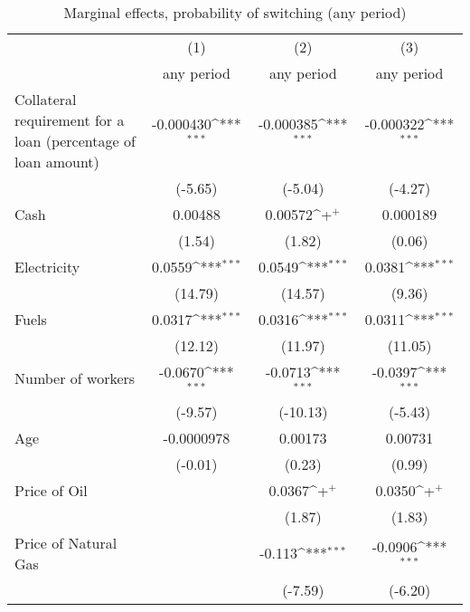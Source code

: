 \begin{table}[htbp]\centering
\def\sym#1{\ifmmode^{#1}\else\(^{#1}\)\fi}
\caption{Marginal effects, probability of switching (any period)}
\begin{tabular}{l*{3}{c}}
\hline\hline
                    &\multicolumn{1}{c}{(1)}&\multicolumn{1}{c}{(2)}&\multicolumn{1}{c}{(3)}\\
                    &\multicolumn{1}{c}{any period}&\multicolumn{1}{c}{any period}&\multicolumn{1}{c}{any period}\\
\hline
Collateral requirement for a loan (percentage of loan amount)&   -0.000430\sym{***}&   -0.000385\sym{***}&   -0.000322\sym{***}\\
                    &     (-5.65)         &     (-5.04)         &     (-4.27)         \\
[1em]
Cash                &     0.00488         &     0.00572\sym{+}  &    0.000189         \\
                    &      (1.54)         &      (1.82)         &      (0.06)         \\
[1em]
Electricity         &      0.0559\sym{***}&      0.0549\sym{***}&      0.0381\sym{***}\\
                    &     (14.79)         &     (14.57)         &      (9.36)         \\
[1em]
Fuels               &      0.0317\sym{***}&      0.0316\sym{***}&      0.0311\sym{***}\\
                    &     (12.12)         &     (11.97)         &     (11.05)         \\
[1em]
Number of workers   &     -0.0670\sym{***}&     -0.0713\sym{***}&     -0.0397\sym{***}\\
                    &     (-9.57)         &    (-10.13)         &     (-5.43)         \\
[1em]
Age                 &  -0.0000978         &     0.00173         &     0.00731         \\
                    &     (-0.01)         &      (0.23)         &      (0.99)         \\
[1em]
Price of Oil        &                     &      0.0367\sym{+}  &      0.0350\sym{+}  \\
                    &                     &      (1.87)         &      (1.83)         \\
[1em]
Price of Natural Gas&                     &      -0.113\sym{***}&     -0.0906\sym{***}\\
                    &                     &     (-7.59)         &     (-6.20)         \\

\end{tabular}
\end{table}
